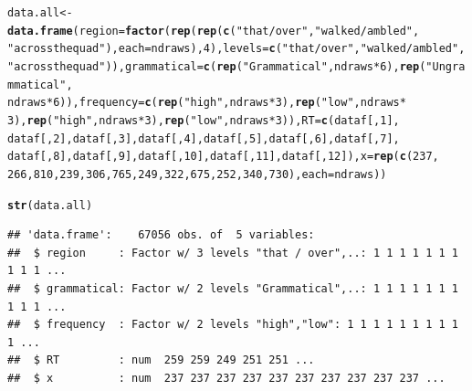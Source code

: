 \documentclass{article}\usepackage[]{graphicx}\usepackage[]{color}
\makeatletter
\newcommand{\hlnum}[1]{\textcolor[rgb]{0.686,0.059,0.569}{#1}}%
\newcommand{\hlstr}[1]{\textcolor[rgb]{0.192,0.494,0.8}{#1}}%
\newcommand{\hlopt}[1]{\textcolor[rgb]{0,0,0}{#1}}%
\newcommand{\hlstd}[1]{\textcolor[rgb]{0.345,0.345,0.345}{#1}}%
\newcommand{\hlkwb}[1]{\textcolor[rgb]{0.69,0.353,0.396}{#1}}%
\newcommand{\hlkwc}[1]{\textcolor[rgb]{0.333,0.667,0.333}{#1}}%
\newcommand{\hlkwd}[1]{\textcolor[rgb]{0.737,0.353,0.396}{\textbf{#1}}}%
\newenvironment{kframe}{%
 \def\at@end@of@kframe{}%
 \ifinner\ifhmode%
  \def\at@end@of@kframe{\end{minipage}}%
  \begin{minipage}{\columnwidth}%
 \fi\fi%
 \def\FrameCommand##1{\hskip\@totalleftmargin \hskip-\fboxsep
 \colorbox{shadecolor}{##1}\hskip-\fboxsep
     \hskip-\linewidth \hskip-\@totalleftmargin \hskip\columnwidth}%
 \MakeFramed {\advance\hsize-\width
   \@totalleftmargin\z@ \linewidth\hsize
   \@setminipage}}%
 {\par\unskip\endMakeFramed%
 \at@end@of@kframe}
\newenvironment{knitrout}{}{} %
\makeatother
\begin{document}
\begin{knitrout}
\begin{kframe}
\begin{alltt}
\hlstd{data.all} \hlkwb{<-} \hlkwd{data.frame}\hlstd{(}\hlkwc{region} \hlstd{=} \hlkwd{factor}\hlstd{(}\hlkwd{rep}\hlstd{(}\hlkwd{rep}\hlstd{(}\hlkwd{c}\hlstd{(}\hlstr{"that / over"}\hlstd{,} \hlstr{"walked / ambled"}\hlstd{,}
    \hlstr{"across the quad"}\hlstd{),} \hlkwc{each} \hlstd{= ndraws),} \hlnum{4}\hlstd{),} \hlkwc{levels} \hlstd{=} \hlkwd{c}\hlstd{(}\hlstr{"that / over"}\hlstd{,} \hlstr{"walked / ambled"}\hlstd{,}
    \hlstr{"across the quad"}\hlstd{)),} \hlkwc{grammatical} \hlstd{=} \hlkwd{c}\hlstd{(}\hlkwd{rep}\hlstd{(}\hlstr{"Grammatical"}\hlstd{, ndraws} \hlopt{*} \hlnum{6}\hlstd{),} \hlkwd{rep}\hlstd{(}\hlstr{"Ungrammatical"}\hlstd{,}
    \hlstd{ndraws} \hlopt{*} \hlnum{6}\hlstd{)),} \hlkwc{frequency} \hlstd{=} \hlkwd{c}\hlstd{(}\hlkwd{rep}\hlstd{(}\hlstr{"high"}\hlstd{, ndraws} \hlopt{*} \hlnum{3}\hlstd{),} \hlkwd{rep}\hlstd{(}\hlstr{"low"}\hlstd{, ndraws} \hlopt{*}
    \hlnum{3}\hlstd{),} \hlkwd{rep}\hlstd{(}\hlstr{"high"}\hlstd{, ndraws} \hlopt{*} \hlnum{3}\hlstd{),} \hlkwd{rep}\hlstd{(}\hlstr{"low"}\hlstd{, ndraws} \hlopt{*} \hlnum{3}\hlstd{)),} \hlkwc{RT} \hlstd{=} \hlkwd{c}\hlstd{(dataf[,} \hlnum{1}\hlstd{],}
    \hlstd{dataf[,} \hlnum{2}\hlstd{], dataf[,} \hlnum{3}\hlstd{], dataf[,} \hlnum{4}\hlstd{], dataf[,} \hlnum{5}\hlstd{], dataf[,} \hlnum{6}\hlstd{], dataf[,} \hlnum{7}\hlstd{],}
    \hlstd{dataf[,} \hlnum{8}\hlstd{], dataf[,} \hlnum{9}\hlstd{], dataf[,} \hlnum{10}\hlstd{], dataf[,} \hlnum{11}\hlstd{], dataf[,} \hlnum{12}\hlstd{]),} \hlkwc{x} \hlstd{=} \hlkwd{rep}\hlstd{(}\hlkwd{c}\hlstd{(}\hlnum{237}\hlstd{,}
    \hlnum{266}\hlstd{,} \hlnum{810}\hlstd{,} \hlnum{239}\hlstd{,} \hlnum{306}\hlstd{,} \hlnum{765}\hlstd{,} \hlnum{249}\hlstd{,} \hlnum{322}\hlstd{,} \hlnum{675}\hlstd{,} \hlnum{252}\hlstd{,} \hlnum{340}\hlstd{,} \hlnum{730}\hlstd{),} \hlkwc{each} \hlstd{= ndraws))}

\hlkwd{str}\hlstd{(data.all)}
\end{alltt}
\begin{verbatim}
## 'data.frame':	67056 obs. of  5 variables:
##  $ region     : Factor w/ 3 levels "that / over",..: 1 1 1 1 1 1 1 1 1 1 ...
##  $ grammatical: Factor w/ 2 levels "Grammatical",..: 1 1 1 1 1 1 1 1 1 1 ...
##  $ frequency  : Factor w/ 2 levels "high","low": 1 1 1 1 1 1 1 1 1 1 ...
##  $ RT         : num  259 259 249 251 251 ...
##  $ x          : num  237 237 237 237 237 237 237 237 237 237 ...
\end{verbatim}
\end{kframe}
\end{knitrout}
\end{document}
